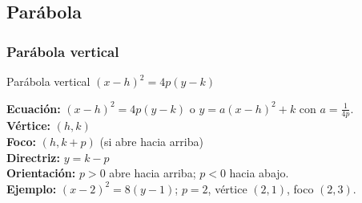 \documentclass[12pt,a4paper]{article}
\begin{document}
\subsection{Parábola}
\subsubsection{Parábola vertical}
\begin{funcbox}{Parábola vertical $(x-h)^2=4p(y-k)$}
\begin{minipage}[t]{0.55\textwidth}
    \textbf{Ecuación:} $(x-h)^2=4p(y-k)$ o $y=a(x-h)^2+k$ con $a=\frac{1}{4p}$.\\
    \textbf{Vértice:} $(h,k)$\\
    \textbf{Foco:} $(h, k+p)$ (si abre hacia arriba)\\
    \textbf{Directriz:} $y=k-p$\\
    \textbf{Orientación:} $p>0$ abre hacia arriba; $p<0$ hacia abajo.\\
    \textbf{Ejemplo:} $(x-2)^2=8(y-1)$; $p=2$, vértice $(2,1)$, foco $(2,3)$.
\end{minipage}\hfill
\begin{minipage}[t]{0.4\textwidth}
    \centering
\end{minipage}
\end{funcbox}
\end{document}
